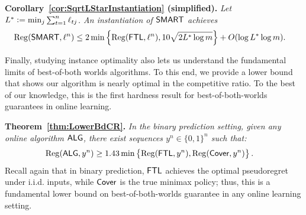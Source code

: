 {\bf Corollary~\ref{cor:SqrtLStarInstantiation} (simplified).} 
\emph{Let $L^* \mathrel{\mathop{:}}= \min_j \sum_{t=1}^n \ell_{tj}$. An instantiation of $\mathsf{SMART}$ achieves}
    \begin{align*}
        \mathrm{Reg}(\mathsf{SMART}, \ell^n) 
        &\le 2 \min\left\{ \mathrm{Reg}(\mathsf{FTL},\ell^n), 10 \sqrt{2L^* \log m} \right\}
        + O(\log L^* \log m). 
    \end{align*}

Finally, studying instance optimality also lets us understand the fundamental limits of best-of-both worlds algorithms.
To this end, we provide a lower bound that shows our algorithm is nearly optimal in the competitive ratio. 
To the best of our knowledge, this is the first hardness result for best-of-both-worlds guarantees in online learning.

{\bf Theorem~\ref{thm:LowerBdCR}.} 
\emph{In the binary prediction setting, given \emph{any} online algorithm $\mathsf{ALG}$, there exist sequences $y^n\in\{0,1\}^n$ such that:}
\begin{align*}
    \mathrm{Reg}(\mathsf{ALG},y^n)
    &\geq 1.43\min\left\{\mathrm{Reg}(\mathsf{FTL},y^n),\mathrm{Reg}(\mathsf{Cover},y^n)\right\}.
\end{align*}
Recall again that in binary prediction, $\mathsf{FTL}$ achieves the optimal pseudoregret under i.i.d. inputs, while $\mathsf{Cover}$ is the true minimax policy; thus, this is a fundamental lower bound on best-of-both-worlds guarantee in any online learning setting.



